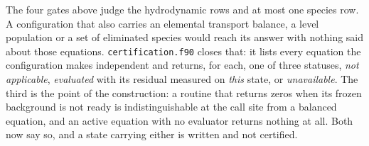 The four gates above judge the hydrodynamic rows and at most one species row.
A configuration that also carries an elemental transport balance, a level
population or a set of eliminated species would reach its answer with nothing
said about those equations.  \texttt{certification.f90} closes that: it lists
every equation the configuration makes independent and returns, for each, one
of three statuses, \emph{not applicable}, \emph{evaluated} with its residual
measured on \emph{this} state, or \emph{unavailable}.  The third is the point
of the construction: a routine that returns zeros when its frozen background
is not ready is indistinguishable at the call site from a balanced equation,
and an active equation with no evaluator returns nothing at all.  Both now say
so, and a state carrying either is written and not certified.

